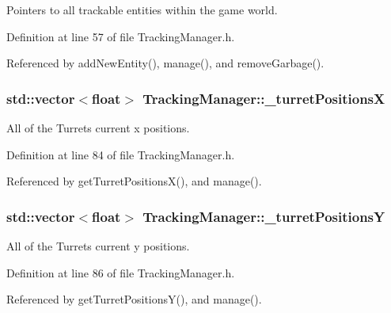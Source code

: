 Pointers to all trackable entities within the game world. 



Definition at line 57 of file Tracking\-Manager.\-h.



Referenced by add\-New\-Entity(), manage(), and remove\-Garbage().

\hypertarget{classTrackingManager_ad66641438bdcf33e772ef4ec1cdc7e14}{
\subsubsection[{\-\_\-turret\-Positions\-X}]{\setlength{\rightskip}{0pt plus 5cm}std\-::vector$<$float$>$ Tracking\-Manager\-::\-\_\-turret\-Positions\-X\hspace{0.3cm}{\ttfamily [private]}}}\label{classTrackingManager_ad66641438bdcf33e772ef4ec1cdc7e14}


All of the Turrets current x positions. 



Definition at line 84 of file Tracking\-Manager.\-h.



Referenced by get\-Turret\-Positions\-X(), and manage().

\hypertarget{classTrackingManager_aaf2aa5d29aa7a7abd3a7e7f27bff7340}{
\subsubsection[{\-\_\-turret\-Positions\-Y}]{\setlength{\rightskip}{0pt plus 5cm}std\-::vector$<$float$>$ Tracking\-Manager\-::\-\_\-turret\-Positions\-Y\hspace{0.3cm}{\ttfamily [private]}}}\label{classTrackingManager_aaf2aa5d29aa7a7abd3a7e7f27bff7340}


All of the Turrets current y positions. 



Definition at line 86 of file Tracking\-Manager.\-h.



Referenced by get\-Turret\-Positions\-Y(), and manage().

